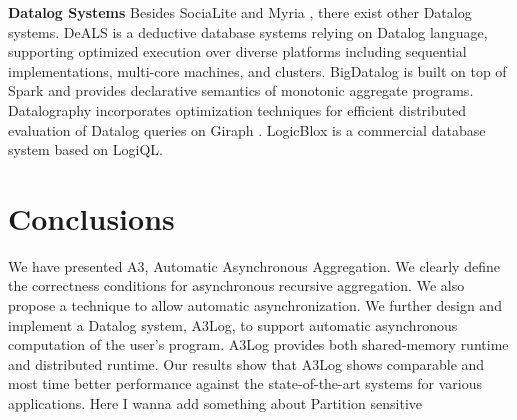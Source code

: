 \noindent\textbf{Datalog Systems}
Besides SociaLite \cite{Lam:2013:SDE:2510649.2511289,Seo:2013:DSD:2556549.2556572} and Myria \cite{Halperin:2014:DMB:2588555.2594530,Wang:2015:AFR:2824032.2824052}, there exist other Datalog systems. DeALS \cite{Shkapsky:2013:GQN:2536274.2536290,7113340} is a deductive database systems relying on Datalog language, supporting optimized execution over diverse platforms including sequential implementations, multi-core machines, and clusters. BigDatalog \cite{Shkapsky:2016:BDA:2882903.2915229} is built on top of Spark \cite{Zaharia:2010:SCC:1863103.1863113} and provides declarative semantics of monotonic aggregate programs. Datalography \cite{7840589} incorporates optimization techniques for efficient distributed evaluation of Datalog queries on Giraph \cite{giraph}. LogicBlox \cite{Aref:2015:DIL:2723372.2742796} is a commercial database system based on LogiQL.

\section{Conclusions}
\label{sec:conclusion}

We have presented A3, Automatic Asynchronous Aggregation. We clearly define the correctness conditions for asynchronous recursive aggregation.  We also propose a technique to allow automatic asynchronization. We further design and implement a Datalog system, A3Log, to support automatic asynchronous computation of the user's program. A3Log provides both shared-memory runtime and distributed runtime. Our results show that A3Log shows comparable and most time better performance against the state-of-the-art systems for various applications.
{\color{red}Here I wanna add something about Partition sensitive}

